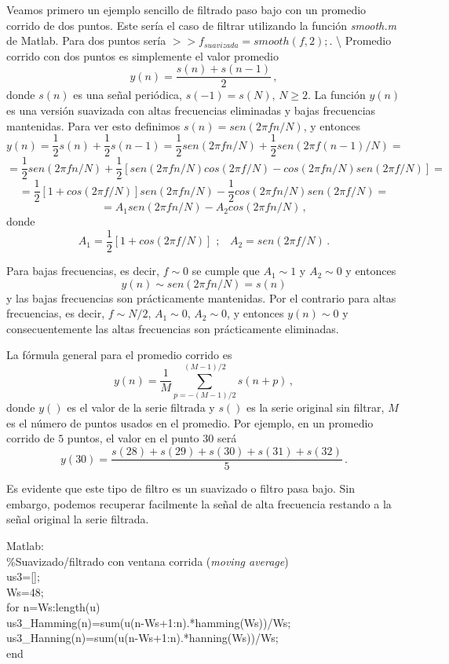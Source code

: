 \documentclass[
]{agujournal2019}
\begin{document}
Veamos primero un ejemplo sencillo de filtrado paso bajo con un promedio
corrido de dos puntos. Este sería el caso de filtrar utilizando la
función \emph{smooth.m} de Matlab. Para dos puntos sería
\(>> f_{suavizada}=smooth(f,2);\). \textbackslash{} Promedio corrido con
dos puntos es simplemente el valor promedio
\[y(n)=\frac{s(n) + s(n-1)}{2}\,,\] donde \(s(n)\) es una señal
periódica, \(s(-1)=s(N)\), \(N\ge 2\). La función \(y(n)\) es una
versión suavizada con altas frecuencias eliminadas y bajas frecuencias
mantenidas. Para ver esto definimos \(s(n)=sen(2\pi f n/N)\), y entonces
\[y(n)=\frac{1}{2} s(n) + \frac{1}{2} s(n-1)=\frac{1}{2} sen(2\pi f n/N) + \frac{1}{2} sen(2\pi f (n-1)/N)=\]
\[=\frac{1}{2}sen(2\pi f n/N) + \frac{1}{2}\left[ sen(2\pi f n/N)cos(2\pi f/N) - cos(2\pi f n/N)sen(2\pi f/N)\right]=\]
\[=\frac{1}{2}\left[ 1+cos(2\pi f/N)\right]sen(2\pi f n/N) - \frac{1}{2} cos(2\pi f n/N)sen(2\pi f/N)=\]
\[=A_1sen(2\pi f n/N) - A_2cos(2\pi f n/N)\,,\] donde
\[A_1=\frac{1}{2}\left[ 1+cos(2\pi f/N)\right]\,\,;\,\,\,\,\,A_2=sen(2\pi f/N)\,.\]

Para bajas frecuencias, es decir, \(f\sim 0\) se cumple que
\(A_1\sim 1\) y \(A_2 \sim 0\) y entonces
\[y(n)\sim sen(2\pi f n/N)=s(n)\] y las bajas frecuencias son
prácticamente mantenidas. Por el contrario para altas frecuencias, es
decir, \(f\sim N/2\), \(A_1\sim 0\), \(A_2\sim0\), y entonces
\(y(n)\sim0\) y consecuentemente las altas frecuencias son prácticamente
eliminadas.

La fórmula general para el promedio corrido es
\[y(n)=\frac{1}{M}\sum\limits^{(M-1)/2}_{p=-(M-1)/2} s(n+p)\,,\] donde
\(y( )\) es el valor de la serie filtrada y \(s( )\) es la serie
original sin filtrar, \(M\) es el número de puntos usados en el
promedio. Por ejemplo, en un promedio corrido de \(5\) puntos, el valor
en el punto \(30\) será
\[y(30)=\frac{s(28)+s(29)+s(30)+s(31)+s(32)}{5}\,.\]

Es evidente que este tipo de filtro es un suavizado o filtro pasa bajo.
Sin embargo, podemos recuperar facilmente la señal de alta frecuencia
restando a la señal original la serie filtrada.

\begin{framed}
{\textbf \noindent Matlab}:
\\
\%Suavizado/filtrado con ventana corrida ({\it moving average})\\
us3=[];\\
Ws=48;\\
for n=Ws:length(u)\\
    us3\_Hamming(n)=sum(u(n-Ws+1:n).*hamming(Ws))/Ws;\\
    us3\_Hanning(n)=sum(u(n-Ws+1:n).*hanning(Ws))/Ws;\\
end\\

\end{framed}
\end{document}
